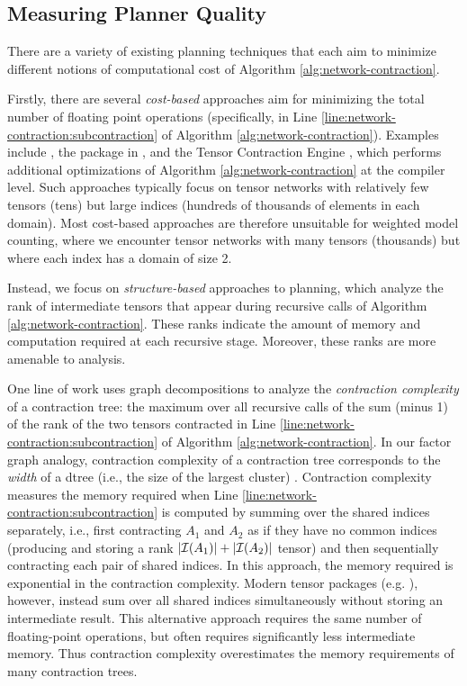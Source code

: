 \subsection{Measuring Planner Quality}
\label{sec:tensors:planning:quality}
There are a variety of existing planning techniques that each aim to minimize different notions of computational cost of Algorithm \ref{alg:network-contraction}.

Firstly, there are several \emph{cost-based} approaches aim for minimizing the total number of floating point operations (specifically, in Line \ref{line:network-contraction:subcontraction} of Algorithm \ref{alg:network-contraction}).
Examples include \cite{PHV14}, the  package in , and the Tensor Contraction Engine \cite{Hirata03}, which performs additional optimizations of Algorithm \ref{alg:network-contraction} at the compiler level. %
Such approaches typically focus on tensor networks with relatively few tensors (tens) but large indices (hundreds of thousands of elements in each domain).
Most cost-based approaches are therefore unsuitable for weighted model counting, where we encounter tensor networks with many tensors (thousands) but where each index has a domain of size 2.

Instead, we focus on \emph{structure-based} approaches to planning, which analyze the rank of intermediate tensors that appear during recursive calls of Algorithm \ref{alg:network-contraction}. 
These ranks indicate the amount of memory and computation required at each recursive stage. Moreover, these ranks are more amenable to analysis.

One line of work \cite{MS08,DFGHSW18} uses graph decompositions to analyze the \emph{contraction complexity} of a contraction tree: the maximum over all recursive calls of the sum (minus 1) of the rank of the two tensors contracted in Line \ref{line:network-contraction:subcontraction} of Algorithm \ref{alg:network-contraction}. In our factor graph analogy, contraction complexity of a contraction tree corresponds to the \emph{width} of a dtree (i.e., the size of the largest cluster) \cite{darwiche01b}.
Contraction complexity measures the memory required when Line \ref{line:network-contraction:subcontraction} is computed by summing over the shared indices separately, i.e., first contracting $A_1$ and $A_2$ as if they have no common indices (producing and storing a rank $|\mathcal{I}(A_1)|+|\mathcal{I}(A_2)|$ tensor) and then sequentially contracting each pair of shared indices. In this approach, the memory required is exponential in the contraction complexity. Modern tensor packages (e.g. ), however, instead sum over all shared indices simultaneously without storing an intermediate result. This alternative approach requires the same number of floating-point operations, but often requires significantly less intermediate memory. Thus contraction complexity overestimates the memory requirements of many contraction trees. 

